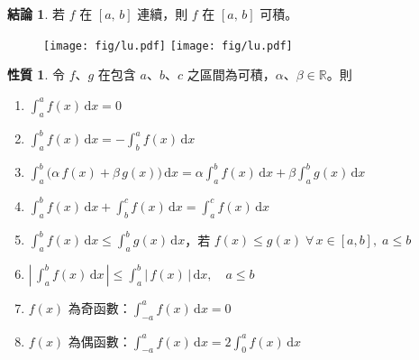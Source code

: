 \documentclass[12pt]{extarticle}
\newcommand{\ds}{\displaystyle}
\theoremstyle{definition}
\newtheorem*{prp}{性質}
\newtheorem*{fact}{結論}
\begin{document}
\begin{fact}
  若 $f$ 在 $[a,\,b]$ 連續，則 $f$ 在 $[a,\,b]$ 可積。
\end{fact}

\begin{figure}[!htbp]
  \centering
  \texttt{[image: fig/lu.pdf]}
  \hspace{2cm}
  \texttt{[image: fig/lu.pdf]}
\end{figure}

\begin{prp}%
  令 $f$、$g$ 在包含 $a$、$b$、$c$ 之區間為可積，$\alpha$、$\beta\in\mathbb{R}$。則
  \begin{enumerate}\setlength{\itemsep}{0pt}
    \item $\ds\int_a^a f(x)\,\mathrm{d}x = 0$
    \item $\ds\int_a^b f(x)\,\mathrm{d}x = -\int_b^a f(x)\,\mathrm{d}x$
    \item $\ds\int_a^b \big(\alpha\,f(x) + \beta\,g(x)\big)\,\mathrm{d}x = \alpha\int_a^b f(x)\,\mathrm{d}x + \beta\int_a^b g(x)\,\mathrm{d}x$
    \item $\ds\int_a^b f(x)\,\mathrm{d}x + \int_b^c f(x)\,\mathrm{d}x = \int_a^c f(x)\,\mathrm{d}x$
    \item $\ds\int_a^b f(x)\,\mathrm{d}x\leqslant\int_a^b g(x)\,\mathrm{d}x$，若 $f(x)\leqslant g(x)\;\forall\,x\in[a, b],\;a\leqslant b$
    \item $\ds\left|\,\int_a^b f(x)\,\mathrm{d}x\,\right|\leqslant \int_a^b \left|\,f(x)\,\right|\,\mathrm{d}x, \quad a\leqslant b$ 
    \item $f(x)$ 為奇函數：$\ds\int_{-a}^a f(x)\,\mathrm{d}x = 0$
    \item $f(x)$ 為偶函數：$\ds\int_{-a}^a f(x)\,\mathrm{d}x = 2\int_0^a f(x)\,\mathrm{d}x$
  \end{enumerate}
\end{prp}
\end{document}
